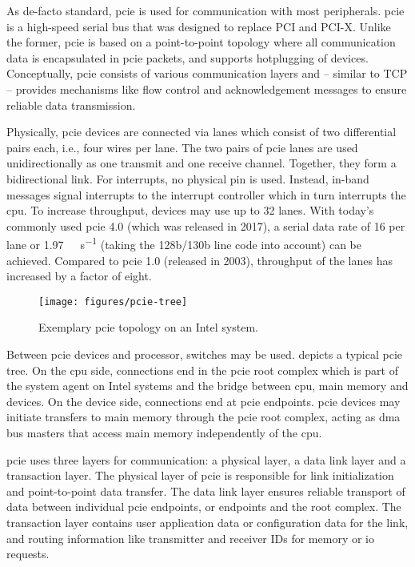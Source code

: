As de-facto standard, \acf{pcie} is used for communication with most
peripherals. \ac{pcie} is a high-speed serial bus that was designed to replace
PCI and PCI-X. Unlike the former, \ac{pcie} is based on a point-to-point
topology where all communication data is encapsulated in \ac{pcie} packets, and
supports hotplugging of devices. Conceptually, \ac{pcie} consists of various
communication layers and -- similar to TCP -- provides mechanisms like flow
control and acknowledgement messages to ensure reliable data transmission.

Physically, \ac{pcie} devices are connected via lanes which consist of two
differential pairs each, i.e., four wires per lane. The two pairs of \ac{pcie}
lanes are used unidirectionally as one transmit and one receive channel.
Together, they form a bidirectional link. For interrupts, no physical pin is
used. Instead, in-band messages signal interrupts to the interrupt controller
which in turn interrupts the \ac{cpu}. To increase throughput, devices may use
up to 32 lanes. With today's commonly used \ac{pcie} 4.0 (which was released in
2017), a serial data rate of \SI{16}{\Gbps} per lane or
\SI{1.97}{\giga\byte\per\second} (taking the 128b/130b line code into account)
can be achieved. Compared to \ac{pcie} 1.0 (released in 2003), throughput of the
lanes has increased by a factor of eight.

\begin{figure}
    \centering
    \texttt{[image: figures/pcie-tree]}
    \caption{Exemplary \acs{pcie} topology on an Intel system.}
    \label{fig:pcie-topology}
\end{figure}

Between \ac{pcie} devices and processor, switches may be used.
 depicts a typical \ac{pcie} tree. On the \ac{cpu} side,
connections end in the \ac{pcie} root complex which is part of the system agent
on Intel systems and the bridge between \ac{cpu}, main memory and devices. On
the device side, connections end at \ac{pcie} endpoints. \ac{pcie} devices may
initiate transfers to main memory through the \ac{pcie} root complex, acting as
\acs{dma} bus masters that access main memory independently of the \ac{cpu}.

\ac{pcie} uses three layers for communication: a physical layer, a data link
layer and a transaction layer. The physical layer of \ac{pcie} is responsible
for link initialization and point-to-point data transfer. The data link layer
ensures reliable transport of data between individual \ac{pcie} endpoints, or
endpoints and the root complex. The transaction layer contains user application
data or configuration data for the link, and routing information like
transmitter and receiver IDs for memory or \ac{io} requests.


